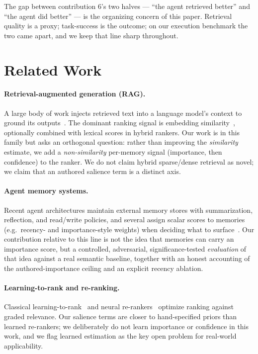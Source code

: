 \documentclass[11pt]{article}
\begin{document}
The gap between contribution 6's two halves --- ``the agent retrieved better'' and ``the
agent did better'' --- is the organizing concern of this paper. Retrieval quality is a
proxy; task-success is the outcome; on our execution benchmark the two came apart, and we
keep that line sharp throughout.

\section{Related Work}

\paragraph{Retrieval-augmented generation (RAG).} A large body of work injects retrieved
text into a language model's context to ground its outputs~\cite{lewis2020rag}. The
dominant ranking signal is embedding similarity~\cite{karpukhin2020dpr}, optionally
combined with lexical scores in hybrid rankers. Our work is in this family but asks an
orthogonal question: rather than improving the \emph{similarity} estimate, we add a
\emph{non-similarity} per-memory signal (importance, then confidence) to the ranker. We do
not claim hybrid sparse/dense retrieval as novel; we claim that an authored salience term
is a distinct axis.

\paragraph{Agent memory systems.} Recent agent architectures maintain external memory
stores with summarization, reflection, and read/write policies, and several assign scalar
scores to memories (e.g.\ recency- and importance-style weights) when deciding what to
surface~\cite{park2023generative,packer2023memgpt}. Our contribution relative to this line
is not the idea that memories can carry an importance score, but a controlled, adversarial,
significance-tested \emph{evaluation} of that idea against a real semantic baseline,
together with an honest accounting of the authored-importance ceiling and an explicit
recency ablation.

\paragraph{Learning-to-rank and re-ranking.} Classical learning-to-rank~\cite{liu2009ltr}
and neural re-rankers~\cite{nogueira2020monot5} optimize ranking against graded relevance.
Our salience terms are closer to hand-specified priors than learned re-rankers; we
deliberately do not learn importance or confidence in this work, and we flag learned
estimation as the key open problem for real-world applicability.
\end{document}
